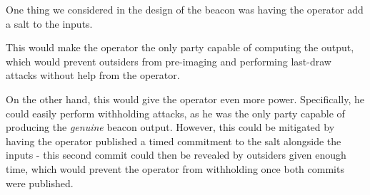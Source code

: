 One thing we considered in the design of the beacon was having the operator add a salt to the inputs.

This would make the operator the only party capable of computing the output, which would prevent outsiders from pre-imaging and performing last-draw attacks without help from the operator.

On the other hand, this would give the operator even more power. Specifically, he could easily perform withholding attacks, as he was the only party capable of producing the \textit{genuine} beacon output. However, this could be mitigated by having the operator published a timed commitment to the salt alongside the inputs - this second commit could then be revealed by outsiders given enough time, which would prevent the operator from withholding once both commits were published.
